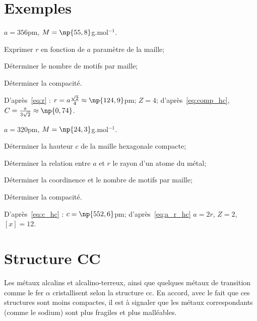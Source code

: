 \section{Exemples}
\begin{ex}
    $a = 356$pm,
    $M = \np{55,8}$g.mol$^{-1}$.
    \begin{compactitem}
        \item Exprimer $r$ en fonction de $a$ paramètre
            de la maille;
        \item Déterminer le nombre de motifs par maille;
        \item Déterminer la compacité.
    \end{compactitem}
    D'après~\ref{eq:r} : $r = a\frac{\sqrt{2}}{4} \approx \np{124,9}$pm;
    $Z = 4$;
    d'après~\ref{eq:comp_hc}, $C = \frac{\pi}{3\sqrt{2}} \approx \np{0,74}$.
\end{ex}
\begin{ex}
    $a = 320$pm,
    $M = \np{24,3}$g.mol$^{-1}$.
    \begin{compactitem}
        \item Déterminer la hauteur $c$ de la maille hexagonale
            compacte;
        \item Déterminer la relation entre $a$ et $r$ le rayon
            d'un atome du métal;
        \item Déterminer la coordinence et le nombre de motifs par
            maille;
        \item Déterminer la compacité.
    \end{compactitem}
    D'après~\ref{eq:c_hc} : $c = \np{552,6}$pm; d'après~\ref{eq;a_r_hc}
    $a = 2r$, $Z = 2$, $[x] = 12$.
\end{ex}



\section{Structure CC}
Les métaux alcalins et alcalino-terreux, ainsi que quelques
métaux de transition comme le fer $\alpha$ cristallisent selon la structure cc.
En accord, avec le fait que ces structures sont moins compactes,
il est à signaler que les métaux correspondants (comme le sodium) sont
plus fragiles et plus malléables.

